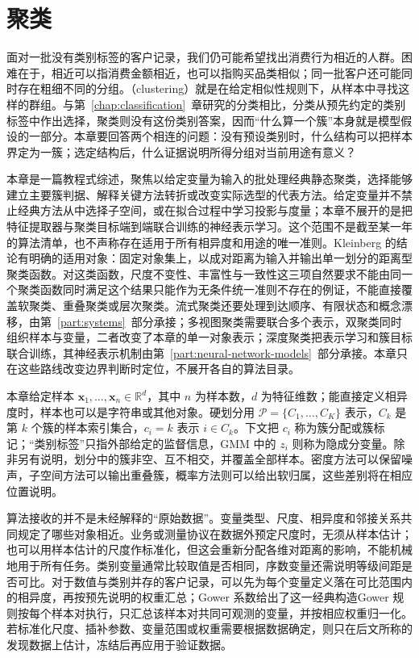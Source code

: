 \chapter{聚类}
\label{chap:clustering}

面对一批没有类别标签的客户记录，我们仍可能希望找出消费行为相近的人群。困难在于，相近可以指消费金额相近，也可以指购买品类相似；同一批客户还可能同时存在粗细不同的分组。（clustering）就是在给定相似性规则下，从样本中寻找这样的群组。与第~\ref{chap:classification}~章研究的分类相比，分类从预先约定的类别标签中作出选择，聚类则没有这份类别答案，因而“什么算一个簇”本身就是模型假设的一部分。本章要回答两个相连的问题：没有预设类别时，什么结构可以把样本界定为一簇；选定结构后，什么证据说明所得分组对当前用途有意义？

本章是一篇教程式综述，聚焦以给定变量为输入的批处理经典静态聚类，选择能够建立主要簇判据、解释关键方法转折或改变实际选型的代表方法。给定变量并不禁止经典方法从中选择子空间，或在拟合过程中学习投影与度量；本章不展开的是把特征提取器与聚类目标端到端联合训练的神经表示学习。这个范围不是截至某一年的算法清单，也不声称存在适用于所有相异度和用途的唯一准则。Kleinberg 的结论有明确的适用对象：固定对象集上，以成对距离为输入并输出单一划分的距离型聚类函数。对这类函数，尺度不变性、丰富性与一致性这三项自然要求不能由同一个聚类函数同时满足这个结果只能作为无条件统一准则不存在的例证，不能直接覆盖软聚类、重叠聚类或层次聚类。流式聚类还要处理到达顺序、有限状态和概念漂移，由第~\ref{part:systems}~部分承接；多视图聚类需要联合多个表示，双聚类同时组织样本与变量，二者改变了本章的单一对象表示；深度聚类把表示学习和簇目标联合训练，其神经表示机制由第~\ref{part:neural-network-models}~部分承接。本章只在这些路线改变边界判断时定位，不展开各自的算法目录。

本章给定样本 $\bm{x}_1,\ldots,\bm{x}_n\in\mathbb{R}^d$，其中 $n$ 为样本数，$d$ 为特征维数；能直接定义相异度时，样本也可以是字符串或其他对象。硬划分用 $\mathcal{P}=\{C_1,\ldots,C_K\}$ 表示，$C_k$ 是第 $k$ 个簇的样本索引集合，$c_i=k$ 表示 $i\in C_k$。下文把 $c_i$ 称为簇分配或簇标记；“类别标签”只指外部给定的监督信息，GMM 中的 $z_i$ 则称为隐成分变量。除非另有说明，划分中的簇非空、互不相交，并覆盖全部样本。密度方法可以保留噪声，子空间方法可以输出重叠簇，概率方法则可以给出软归属，这些差别将在相应位置说明。

算法接收的并不是未经解释的“原始数据”。变量类型、尺度、相异度和邻接关系共同规定了哪些对象相近。业务或测量协议在数据外预定尺度时，无须从样本估计；也可以用样本估计的尺度作标准化，但这会重新分配各维对距离的影响，不能机械地用于所有任务。类别变量通常比较取值是否相同，序数变量还需说明等级间距是否可比。对于数值与类别并存的客户记录，可以先为每个变量定义落在可比范围内的相异度，再按预先说明的权重汇总；Gower 系数给出了这一经典构造Gower 规则按每个样本对执行，只汇总该样本对共同可观测的变量，并按相应权重归一化。若标准化尺度、插补参数、变量范围或权重需要根据数据确定，则只在后文所称的发现数据上估计，冻结后再应用于验证数据。

